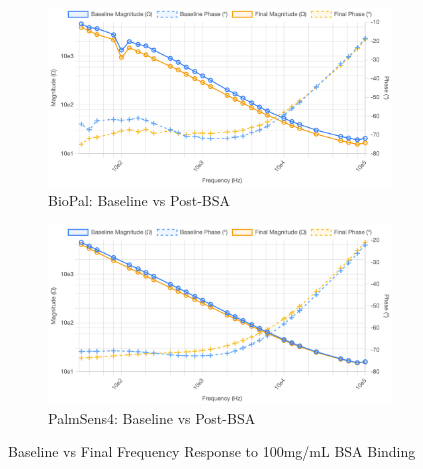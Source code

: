 \begin{figure}[H]
    \centering
    \begin{subfigure}{0.48\textwidth}
        \includegraphics[width=\textwidth]{10g-100mL BioPal.png}   
        \caption{BioPal: Baseline vs Post-BSA}
        \label{fig:10g_biopal}
    \end{subfigure}
    \hfill
    \begin{subfigure}{0.48\textwidth}
        \includegraphics[width=\textwidth]{PalmSens10g.png}
        \caption{PalmSens4: Baseline vs Post-BSA}
        \label{fig:10g_palmsens}
    \end{subfigure}
    \caption{Baseline vs Final Frequency Response to 100mg/mL BSA Binding}
    \label{fig:10g_bsa_comparison_final}
\end{figure}

